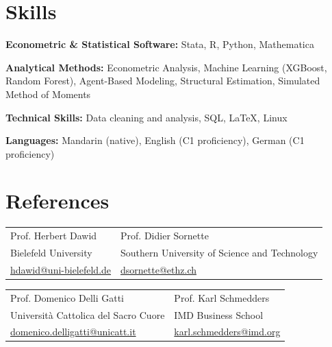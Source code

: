 \documentclass[a4paper,11pt]{article}
\begin{document}
\section{Skills}

\textbf{Econometric \& Statistical Software:} Stata, R, Python, Mathematica  

\textbf{Analytical Methods:} Econometric Analysis, Machine Learning (XGBoost, Random Forest), Agent-Based Modeling, Structural Estimation, Simulated Method of Moments  

\textbf{Technical Skills:} Data cleaning and analysis, SQL, \LaTeX, Linux  

\textbf{Languages:} Mandarin (native), English (C1 proficiency), German (C1 proficiency)

\section{References}

\begin{tabularx}{\linewidth}{X X}
Prof. Herbert Dawid & Prof. Didier Sornette \\
Bielefeld University & Southern University of Science and Technology \\
\href{mailto:hdawid@uni-bielefeld.de}{hdawid@uni-bielefeld.de} &
\href{mailto:dsornette@ethz.ch}{dsornette@ethz.ch}
\end{tabularx}

\vspace{6pt}

\begin{tabularx}{\linewidth}{X X}
Prof. Domenico Delli Gatti & Prof. Karl Schmedders \\
Università Cattolica del Sacro Cuore & IMD Business School \\
\href{mailto:domenico.delligatti@unicatt.it}{domenico.delligatti@unicatt.it} &
\href{mailto:karl.schmedders@imd.org}{karl.schmedders@imd.org}
\end{tabularx}
\end{document}
